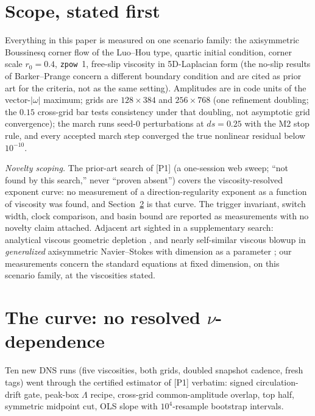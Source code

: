 \documentclass[11pt]{article}
\newcommand{\om}{\omega}
\newcommand{\Lam}{\Lambda}
\begin{document}
\section{Scope, stated first}\label{sec:scope}

Everything in this paper is measured on one scenario family: the
axisymmetric Boussinesq corner flow of the Luo--Hou type, quartic
initial condition, corner scale $r_0=0.4$, \texttt{zpow}~1, free-slip
viscosity in 5D-Laplacian form (the no-slip results of Barker--Prange
\cite{BP20} concern a different boundary condition and are cited as
prior art for the criteria, not as the same setting). Amplitudes are in
code units of the vector-$|\om|$ maximum; grids are $128\times384$ and
$256\times768$ (one refinement doubling; the $0.15$ cross-grid bar
tests consistency under that doubling, not asymptotic grid
convergence); the march runs seed-0 perturbations at $ds=0.25$ with the
M2 stop rule, and every accepted march step converged the true
nonlinear residual below $10^{-10}$.

\emph{Novelty scoping.} The prior-art search of [P1] (a one-session web
sweep; ``not found by this search,'' never ``proven absent'') covers
the viscosity-resolved exponent curve: no measurement of a
direction-regularity exponent as a function of viscosity was found, and
Section~\ref{sec:curve} is that curve. The trigger invariant, switch
width, clock comparison, and basin bound are reported as measurements
with no novelty claim attached. Adjacent art sighted in a supplementary
search: analytical viscous geometric depletion \cite{Ju06,Gru26}, and
nearly self-similar viscous blowup in \emph{generalized} axisymmetric
Navier--Stokes with dimension as a parameter \cite{Hou24}; our
measurements concern the standard equations at fixed dimension, on this
scenario family, at the viscosities stated.

\section{The curve: no resolved \texorpdfstring{$\nu$}{nu}-dependence}
\label{sec:curve}

Ten new DNS runs (five viscosities, both grids, doubled snapshot
cadence, fresh tags) went through the certified estimator of [P1]
verbatim: signed circulation-drift gate, peak-box $\Lam$ recipe,
cross-grid common-amplitude overlap, top half, symmetric midpoint cut,
OLS slope with $10^4$-resample bootstrap intervals.
\end{document}
